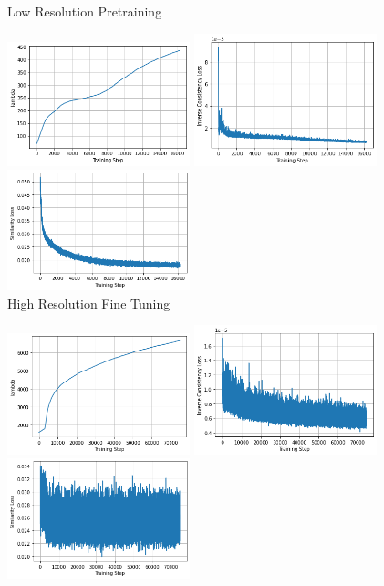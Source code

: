 \documentclass[10pt,onecolumn,letterpaper]{article} %
\begin{document}
\begin{figure}
    \centering
    Low Resolution Pretraining\par\medskip
    \includegraphics[width=150pt]{OAI-training-curves/low_lambda.png}
    \includegraphics[width=150pt]{OAI-training-curves/low_Linv.png}
    \includegraphics[width=150pt]{OAI-training-curves/low_Lsim.png} \\
    High Resolution Fine Tuning\par\medskip
    \includegraphics[width=150pt]{OAI-training-curves/high_lambda.png}
    \includegraphics[width=150pt]{OAI-training-curves/high_Linv.png}
    \includegraphics[width=150pt]{OAI-training-curves/high_Lsim.png} \\

\end{figure}
\end{document}
